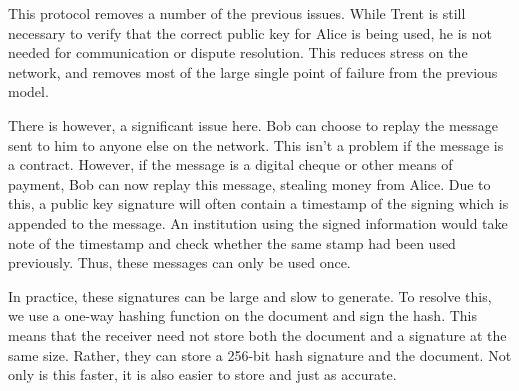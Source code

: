 			This protocol removes a number of the previous issues. 
			While Trent is still necessary to verify that the correct public key for Alice is being used, he is not needed for communication or dispute resolution. 
			This reduces stress on the network, and removes most of the large single point of failure from the previous model. 

			There is however, a significant issue here. 
			Bob can choose to replay the message sent to him to anyone else on the network. 
			This isn't a problem if the message is a contract. 
			However, if the message is a digital cheque or other means of payment, Bob can now replay this message, stealing money from Alice. 
			Due to this, a public key signature will often contain a timestamp of the signing which is appended to the message. 
			An institution using the signed information would take note of the timestamp and check whether the same stamp had been used previously. 
			Thus, these messages can only be used once. 

			In practice, these signatures can be large and slow to generate. 
			To resolve this, we use a one-way hashing function on the document and sign the hash. 
			This means that the receiver need not store both the document and a signature at the same size. 
			Rather, they can store a 256-bit hash signature and the document. 
			Not only is this faster, it is also easier to store and just as accurate. 
			
